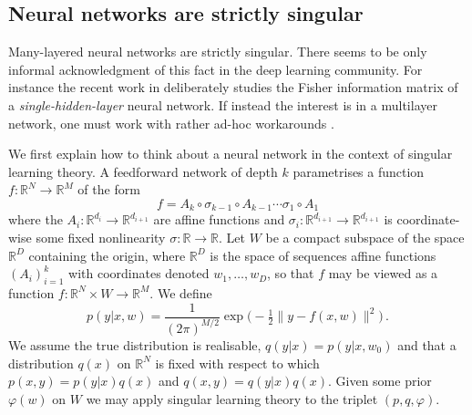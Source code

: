 \documentclass{article} %
\def\lto{\longrightarrow}
\begin{document}
\subsection{Neural networks are strictly singular}
\label{section:nn_singular}
Many-layered neural networks are strictly singular. There seems to be only informal acknowledgment of this fact in the deep learning community. For instance the recent work in \citet{pennington_spectrum_2018} deliberately studies the Fisher information matrix of a \textit{single-hidden-layer} neural network. If instead the interest is in a multilayer network, one must work with rather ad-hoc workarounds  \citep{sun2017relative}.  

We first explain how to think about a neural network in the context of singular learning theory. A feedforward network of depth $k$ parametrises a function $f: \mathbb{R}^N \lto \mathbb{R}^M$ of the form
\[
f = A_k \circ \sigma_{k-1} \circ A_{k-1} \cdots \sigma_1 \circ A_1
\]
where the $A_i: \mathbb{R}^{d_i} \lto \mathbb{R}^{d_{i+1}}$ are affine functions and $\sigma_i: \mathbb{R}^{d_{i+1}} \lto \mathbb{R}^{d_{i+1}}$ is coordinate-wise some fixed nonlinearity $\sigma: \mathbb{R} \lto \mathbb{R}$. Let $W$ be a compact subspace of the space $\mathbb{R}^D$ containing the origin, where $\mathbb{R}^D$ is the space of sequences affine functions $(A_i)_{i=1}^k$ with coordinates denoted $w_1,\ldots,w_D$, so that $f$ may be viewed as a function $f: \mathbb{R}^N \times W \lto \mathbb{R}^M$. We define
\begin{equation}
p(y|x,w) = \frac{1}{(2 \pi)^{M/2}} \exp\Big(-\tfrac{1}{2} \| y - f(x,w) \|^2 \Big)\,.
\label{eq:gaussian_model_in_w}
\end{equation}
We assume the true distribution is realisable, $q(y|x) = p(y|x,w_0)$ and that a distribution $q(x)$ on $\mathbb{R}^N$ is fixed with respect to which $p(x,y) = p(y|x)q(x)$ and $q(x,y) = q(y|x)q(x)$. Given some prior $\varphi(w)$ on $W$ we may apply singular learning theory to the triplet $(p,q,\varphi)$.
\end{document}

